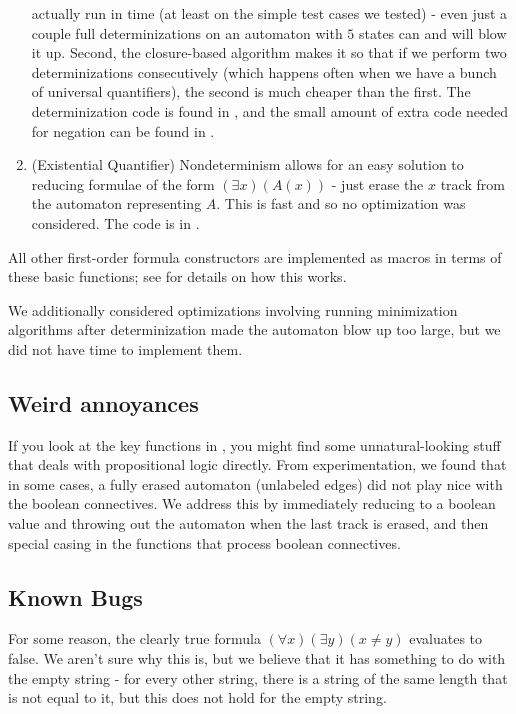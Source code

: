 \documentclass{hw}
\begin{document}
\begin{enumerate}
  actually run in time (at least on the simple test cases we tested) - even just a couple
  full determinizations on an automaton with $5$ states can and will blow it up. Second,
  the closure-based algorithm makes it so that if we perform two determinizations consecutively
  (which happens often when we have a bunch of universal quantifiers), the second is much
  cheaper than the first. The determinization code is found in , and the
  small amount of extra code needed for negation can be found in .
  \item (Existential Quantifier) Nondeterminism allows for an easy solution to reducing
  formulae of the form $(\exists x)(A(x))$ - just erase the $x$ track from the automaton
  representing $A$. This is fast and so no optimization was considered. The code is in .
\end{enumerate}

All other first-order formula constructors are implemented as macros in terms
of these basic functions; see  for details on how this works.

We additionally considered optimizations involving running minimization algorithms after
determinization made the automaton blow up too large, but we did not have time to implement them.

\subsection*{Weird annoyances}
If you look at the key functions in , you might find some unnatural-looking
stuff that deals with propositional logic directly. From experimentation, we found that
in some cases, a fully erased automaton (unlabeled edges) did not play nice with
the boolean connectives. We address this by immediately reducing to a boolean value and
throwing out the automaton when
the last track is erased, and then special casing in the functions that process boolean
connectives.

\subsection*{Known Bugs}
For some reason, the clearly true formula $(\forall x)(\exists y)(x \neq y)$
evaluates to false. We aren't sure why this is, but we believe that it has something
to do with the empty string - for every other string, there is a string of the same
length that is not equal to it, but this does not hold for the empty string.
\end{document}
